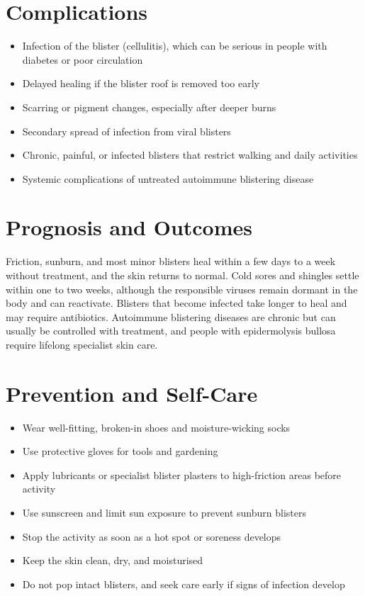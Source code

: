 \section*{Complications}
\begin{itemize}
    \item Infection of the blister (cellulitis), which can be serious in people with diabetes or poor circulation
    \item Delayed healing if the blister roof is removed too early
    \item Scarring or pigment changes, especially after deeper burns
    \item Secondary spread of infection from viral blisters
    \item Chronic, painful, or infected blisters that restrict walking and daily activities
    \item Systemic complications of untreated autoimmune blistering disease
\end{itemize}

\section*{Prognosis and Outcomes}
Friction, sunburn, and most minor blisters heal within a few days to a week without treatment, and the skin returns to normal. Cold sores and shingles settle within one to two weeks, although the responsible viruses remain dormant in the body and can reactivate. Blisters that become infected take longer to heal and may require antibiotics. Autoimmune blistering diseases are chronic but can usually be controlled with treatment, and people with epidermolysis bullosa require lifelong specialist skin care.

\section*{Prevention and Self-Care}
\begin{itemize}
    \item Wear well-fitting, broken-in shoes and moisture-wicking socks
    \item Use protective gloves for tools and gardening
    \item Apply lubricants or specialist blister plasters to high-friction areas before activity
    \item Use sunscreen and limit sun exposure to prevent sunburn blisters
    \item Stop the activity as soon as a hot spot or soreness develops
    \item Keep the skin clean, dry, and moisturised
    \item Do not pop intact blisters, and seek care early if signs of infection develop
\end{itemize}

